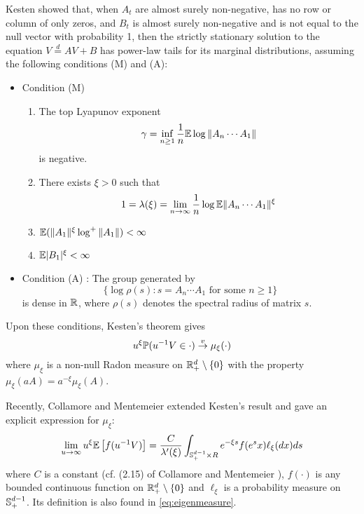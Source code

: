 Kesten \cite{kesten:1973} showed that, when $A_t$ are almost
surely non-negative, has no row or column of only zeros, and
$B_t$ is almost surely non-negative and is not equal to the null
vector with probability 1, then the strictly stationary solution to
the equation $V \overset{d}{=} A V + B$ has power-law tails
for its marginal distributions, assuming the following conditions (M)
and (A):
\begin{itemize}
\item Condition (M)
  \begin{enumerate}
  \item The top Lyapunov exponent
    \[
    \gamma = \inf_{n \geq 1} {1 \over n}\E \log \|A_n \cdots A_1\|
    \]
    is negative.
  \item There exists $\xi > 0$ such that
    \[
    1 = \lambda(\xi) = \lim_{n \to \infty} {1 \over n} \log \E \|A_n \cdots A_1\|^\xi
    \]
  \item $\E (\|A_1\|^\xi \log^+\|A_1\|) < \infty$
  \item $\E |B_1|^\xi < \infty$
  \end{enumerate}
\item Condition (A) : The group generated by
  \[
  \{\log\rho(s): s = A_n \cdots A_1 \text{ for some } n \geq 1\}
  \]
  is dense in $\reals$, where $\rho(s)$ denotes the spectral
  radius of matrix $s$.
\end{itemize}
Upon these conditions, Kesten's theorem gives
\begin{equation*}
  u^\xi \P(u^{-1} V \in \cdot) \overset{v}{\to} \mu_\xi(\cdot)
\end{equation*}
where $\mu_\xi$ is a non-null Radon measure on
$\reals^d_+ \setminus \{0\}$ with the property
$\mu_\xi(a A) = a^{-\xi} \mu_\xi(A)$.

Recently, Collamore and Mentemeier \cite{collamore:mentemeier:2016}
extended Kesten's result and gave an explicit expression for $\mu_\xi$:
\begin{equation}
  \label{eq:CollamoreMentemeierIntro}
  \lim_{u \to \infty} u^{\xi} \E \left[
    f(u^{-1} V)
    \right]
  =
  {C \over \lambda'(\xi)}  
  \int_{\sphere^{d-1}_+ \times R} e^{-\xi s} f(e^s x) \ell_\xi(dx) ds
\end{equation}
where $C$ is a constant (cf. (2.15) of Collamore and Mentemeier
\cite{collamore:mentemeier:2016}), $f(\cdot)$ is any bounded
continuous function on $\reals^{d}_+ \setminus \{0\}$  and
$\ell_\xi$ is a probability measure on $\sphere_+^{d-1}$. Its definition
is also found in \eqref{eq:eigenmeasure}.

